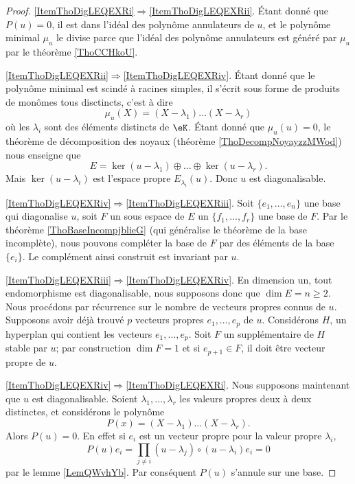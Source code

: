 \begin{proof}
    \ref{ItemThoDigLEQEXRi}\( \Rightarrow\)\ref{ItemThoDigLEQEXRii}. Étant donné que \( P(u)=0\), il est dans l'idéal des polynôme annulateurs de \( u\), et le polynôme minimal \( \mu_u\) le divise parce que l'idéal des polynôme annulateurs est généré par \( \mu_u\) par le théorème \ref{ThoCCHkoU}.

    \ref{ItemThoDigLEQEXRii}\( \Rightarrow\)\ref{ItemThoDigLEQEXRiv}. Étant donné que le polynôme minimal est scindé à racines simples, il s'écrit sous forme de produits de monômes tous disctincts, c'est à dire
    \begin{equation}
        \mu_u(X)=(X-\lambda_1)\ldots(X-\lambda_r)
    \end{equation}
    où les \( \lambda_i\) sont des éléments distincts de \( \eK\). Étant donné que \( \mu_u(u)=0\), le théorème de décomposition des noyaux (théorème \ref{ThoDecompNoyayzzMWod}) nous enseigne que
    \begin{equation}
        E=\ker(u-\lambda_1)\oplus\ldots\oplus\ker(u-\lambda_r).
    \end{equation}
    Mais \( \ker(u-\lambda_i)\) est l'espace propre \( E_{\lambda_i}(u)\). Donc \( u\) est diagonalisable.

    \ref{ItemThoDigLEQEXRiv}\( \Rightarrow\)\ref{ItemThoDigLEQEXRiii}. Soit \( \{ e_1,\ldots, e_n \}\) une base qui diagonalise \( u\), soit \( F\) un sous espace de \( E\) un \( \{ f_1,\ldots, f_r \}\) une base de \( F\). Par le théorème \ref{ThoBaseIncompjblieG} (qui généralise le théorème de la base incomplète), nous pouvons compléter la base de \( F\) par des éléments de la base \( \{ e_i \}\). Le complément ainsi construit est invariant par \( u\).

    \ref{ItemThoDigLEQEXRiii}\( \Rightarrow\)\ref{ItemThoDigLEQEXRiv}. En dimension un, tout endomorphisme est diagonalisable, nous supposons donc que \( \dim E=n\geq 2\). Nous procédons par récurrence sur le nombre de vecteurs propres connus de \( u\). Supposons avoir déjà trouvé \( p\) vecteurs propres \( e_1,\ldots, e_p\) de \( u\). Considérons \( H\), un hyperplan qui contient les vecteurs \( e_1,\ldots, e_p\). Soit \( F\) un supplémentaire de \( H\) stable par \( u\); par construction \( \dim F=1\) et si \( e_{p+1}\in F\), il doit être vecteur propre de \( u\).

    \ref{ItemThoDigLEQEXRiv}\( \Rightarrow\)\ref{ItemThoDigLEQEXRi}. Nous supposons maintenant que \( u\) est diagonalisable. Soient \( \lambda_1,\ldots, \lambda_r\) les valeurs propres deux à deux distinctes, et considérons le polynôme
    \begin{equation}
        P(x)=(X-\lambda_1)\ldots (X-\lambda_r).
    \end{equation}
    Alors \( P(u)=0\). En effet si \( e_i\) est un vecteur propre pour la valeur propre \( \lambda_i\), 
    \begin{equation}
        P(u)e_i=\prod_{j\neq i}(u-\lambda_j)\circ(u-\lambda_i)e_i=0
    \end{equation}
    par le lemme \ref{LemQWvhYb}. Par conséquent \( P(u)\) s'annule sur une base.
\end{proof}

